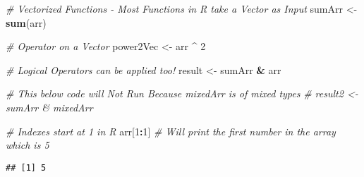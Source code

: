 \documentclass[
]{article}
\newenvironment{Shaded}{\begin{snugshade}}{\end{snugshade}}
\newcommand{\CommentTok}[1]{\textcolor[rgb]{0.56,0.35,0.01}{\textit{#1}}}
\newcommand{\DecValTok}[1]{\textcolor[rgb]{0.00,0.00,0.81}{#1}}
\newcommand{\FunctionTok}[1]{\textcolor[rgb]{0.13,0.29,0.53}{\textbf{#1}}}
\newcommand{\NormalTok}[1]{#1}
\newcommand{\OtherTok}[1]{\textcolor[rgb]{0.56,0.35,0.01}{#1}}
\newcommand{\SpecialCharTok}[1]{\textcolor[rgb]{0.81,0.36,0.00}{\textbf{#1}}}
\begin{document}
\begin{Shaded}
\begin{Highlighting}[]
\CommentTok{\# Vectorized Functions {-} Most Functions in R take a Vector as Input}
\NormalTok{sumArr }\OtherTok{\textless{}{-}} \FunctionTok{sum}\NormalTok{(arr)}

\CommentTok{\# Operator on a Vector}
\NormalTok{power2Vec }\OtherTok{\textless{}{-}}\NormalTok{ arr }\SpecialCharTok{\^{}} \DecValTok{2}

\CommentTok{\# Logical Operators can be applied too!}
\NormalTok{result }\OtherTok{\textless{}{-}}\NormalTok{ sumArr }\SpecialCharTok{\&}\NormalTok{ arr}

\CommentTok{\# This below code will Not Run Because mixedArr is of mixed types}
\CommentTok{\# result2 \textless{}{-} sumArr \& mixedArr}

\CommentTok{\# Indexes start at \textquotesingle{}1\textquotesingle{} in R}
\NormalTok{arr[}\DecValTok{1}\SpecialCharTok{:}\DecValTok{1}\NormalTok{] }\CommentTok{\# Will print the first number in the array which is \textquotesingle{}5\textquotesingle{}}
\end{Highlighting}
\end{Shaded}

\begin{verbatim}
## [1] 5
\end{verbatim}
\end{document}
